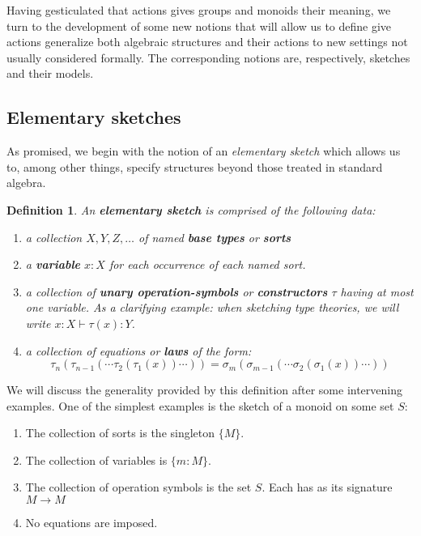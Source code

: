 \documentclass[12pt,twoside]{reedthesis}
\newtheorem{definition}{Definition}
\begin{document}
Having gesticulated that actions gives groups and monoids their meaning, we turn
to the development of some new notions that will allow us to define give actions
generalize both algebraic structures and their actions to new settings not
usually considered formally. %
The corresponding notions are, respectively, sketches and their models.

\subsection{Elementary sketches}
As promised, we begin with the notion of an \emph{elementary sketch} which
allows us to, among other things, specify structures beyond those treated in
standard algebra.
\begin{definition}
  An \textbf{elementary sketch} is comprised of the following data:
  \begin{enumerate}
    \item a collection \(X, Y, Z, \dots \) of named \textbf{base types} or
          \textbf{sorts}
    \item a \textbf{variable} \(x:X\) for each occurrence of each named sort.
    \item a collection of \textbf{unary operation-symbols} or
          \textbf{constructors} \(\tau\) having at most one variable. As a
          clarifying example: when sketching type theories, we will write
          \( x:X \vdash \tau(x) : Y \).
    \item a collection of equations or \textbf{laws} of the
          form: \[ \tau_n (\tau_{n-1}(\cdots \tau_2 (\tau_1 (x))\cdots )) = \sigma_m (\sigma_{m-1}(\cdots \sigma_2 (\sigma_1 (x))\cdots )) \]
  \end{enumerate}
\end{definition}
We will discuss the generality provided by this definition after some
intervening examples. One of the simplest examples is the sketch of a monoid on some set $S$:
\begin{enumerate}
  \item The collection of sorts is the singleton \( \{M\} \).
  \item The collection of variables is \( \{m:M\} \).
  \item The collection of operation symbols is the set \( S \). Each has as its signature \( M \rightarrow M \)
  \item No equations are imposed.
\end{enumerate}
\end{document}
